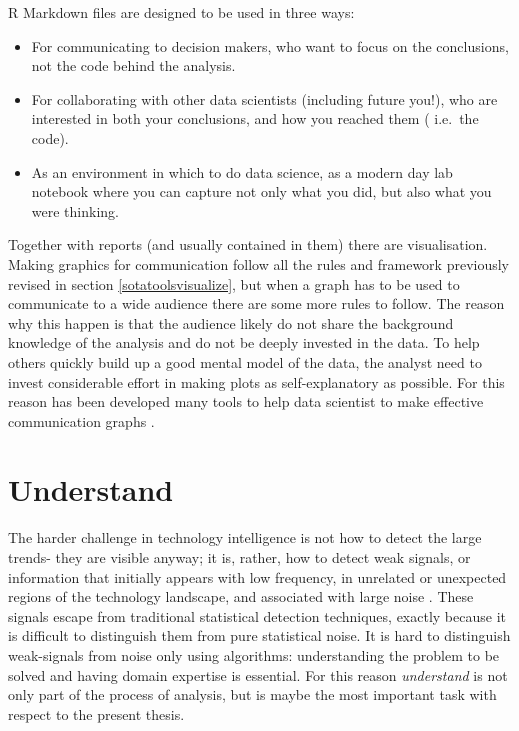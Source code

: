 \documentclass[b5paper,]{book}
\theoremstyle{definition}
\theoremstyle{definition}
\theoremstyle{definition}
\theoremstyle{remark}
\begin{document}
R Markdown files are designed to be used in three ways:

\begin{itemize}
\item
  For communicating to decision makers, who want to focus on the
  conclusions, not the code behind the analysis.
\item
  For collaborating with other data scientists (including future you!),
  who are interested in both your conclusions, and how you reached them
  ( i.e.~the code).
\item
  As an environment in which to do data science, as a modern day lab
  notebook where you can capture not only what you did, but also what
  you were thinking.
\end{itemize}

Together with reports (and usually contained in them) there are
visualisation. Making graphics for communication follow all the rules
and framework previously revised in section \ref{sotatoolsvisualize},
but when a graph has to be used to communicate to a wide audience there
are some more rules to follow. The reason why this happen is that the
audience likely do not share the background knowledge of the analysis
and do not be deeply invested in the data. To help others quickly build
up a good mental model of the data, the analyst need to invest
considerable effort in making plots as self-explanatory as possible. For
this reason has been developed many tools to help data scientist to make
effective communication
graphs\citep{wickham2016ggplot2, shiny2017, plotly2017, ggprah2018, ICWSM09154}
.

\section{Understand}\label{sotadocumentsunderstand}

The harder challenge in technology intelligence is not how to detect the
large trends- they are visible anyway; it is, rather, how to detect weak
signals, or information that initially appears with low frequency, in
unrelated or unexpected regions of the technology landscape, and
associated with large noise \citep{apreda2016functional}. These signals
escape from traditional statistical detection techniques, exactly
because it is difficult to distinguish them from pure statistical noise.
It is hard to distinguish weak-signals from noise only using algorithms:
understanding the problem to be solved and having domain expertise is
essential. For this reason \emph{understand} is not only part of the
process of analysis, but is maybe the most important task with respect
to the present thesis.
\end{document}
